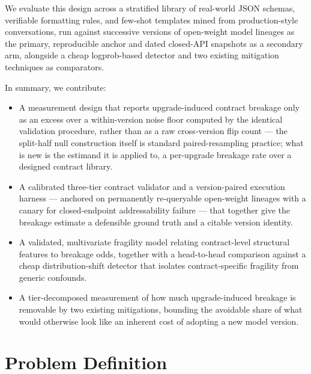 \documentclass[11pt]{article}
\begin{document}
We evaluate this design across a stratified library of real-world JSON schemas, verifiable formatting rules, and few-shot templates mined from production-style conversations, run against successive versions of open-weight model lineages as the primary, reproducible anchor and dated closed-API snapshots as a secondary arm, alongside a cheap logprob-based detector and two existing mitigation techniques as comparators.

In summary, we contribute:
\begin{itemize}[leftmargin=1.4em]
\item A measurement design that reports upgrade-induced contract breakage only as an excess over a within-version noise floor computed by the identical validation procedure, rather than as a raw cross-version flip count --- the split-half null construction itself is standard paired-resampling practice; what is new is the estimand it is applied to, a per-upgrade breakage rate over a designed contract library.
\item A calibrated three-tier contract validator and a version-paired execution harness --- anchored on permanently re-queryable open-weight lineages with a canary for closed-endpoint addressability failure --- that together give the breakage estimate a defensible ground truth and a citable version identity.
\item A validated, multivariate fragility model relating contract-level structural features to breakage odds, together with a head-to-head comparison against a cheap distribution-shift detector that isolates contract-specific fragility from generic confounds.
\item A tier-decomposed measurement of how much upgrade-induced breakage is removable by two existing mitigations, bounding the avoidable share of what would otherwise look like an inherent cost of adopting a new model version.
\end{itemize}

\section{Problem Definition}
\end{document}
